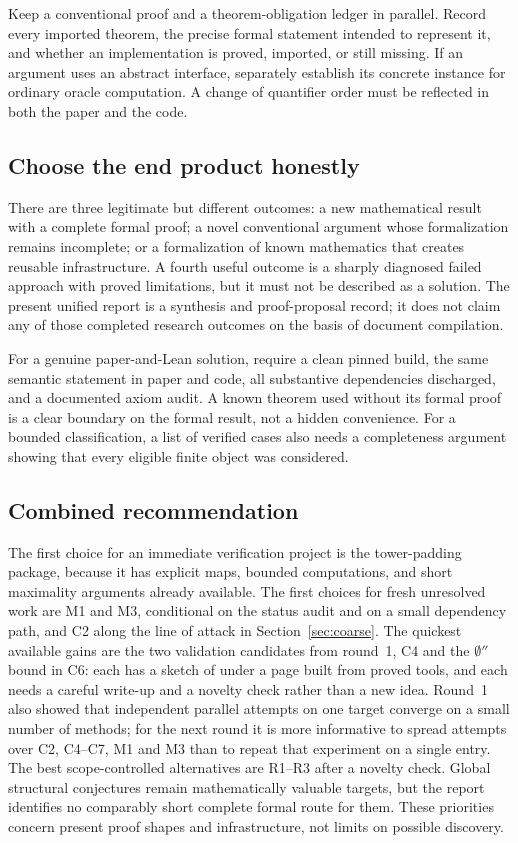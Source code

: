 \documentclass[11pt,a4paper]{article}
\theoremstyle{definition}\newtheorem{definition}[theorem]{Definition}
\theoremstyle{remark}\newtheorem{remark}[theorem]{Remark}
\begin{document}
Keep a conventional proof and a theorem-obligation ledger in parallel. Record every imported theorem, the precise formal statement intended to represent it, and whether an implementation is proved, imported, or still missing. If an argument uses an abstract interface, separately establish its concrete instance for ordinary oracle computation. A change of quantifier order must be reflected in both the paper and the code.

\subsection{Choose the end product honestly}
There are three legitimate but different outcomes: a new mathematical result with a complete formal proof; a novel conventional argument whose formalization remains incomplete; or a formalization of known mathematics that creates reusable infrastructure. A fourth useful outcome is a sharply diagnosed failed approach with proved limitations, but it must not be described as a solution. The present unified report is a synthesis and proof-proposal record; it does not claim any of those completed research outcomes on the basis of document compilation.

For a genuine paper-and-Lean solution, require a clean pinned build, the same semantic statement in paper and code, all substantive dependencies discharged, and a documented axiom audit. A known theorem used without its formal proof is a clear boundary on the formal result, not a hidden convenience. For a bounded classification, a list of verified cases also needs a completeness argument showing that every eligible finite object was considered.

\subsection{Combined recommendation}
The first choice for an immediate verification project is the tower-padding package, because it has explicit maps, bounded computations, and short maximality arguments already available. The first choices for fresh unresolved work are M1 and M3, conditional on the status audit and on a small dependency path, and C2 along the line of attack in Section~\ref{sec:coarse}. The quickest available gains are the two validation candidates from round~1, C4 and the $\emptyset''$ bound in C6: each has a sketch of under a page built from proved tools, and each needs a careful write-up and a novelty check rather than a new idea. Round~1 also showed that independent parallel attempts on one target converge on a small number of methods; for the next round it is more informative to spread attempts over C2, C4--C7, M1 and M3 than to repeat that experiment on a single entry. The best scope-controlled alternatives are R1--R3 after a novelty check. Global structural conjectures remain mathematically valuable targets, but the report identifies no comparably short complete formal route for them. These priorities concern present proof shapes and infrastructure, not limits on possible discovery.
\end{document}
